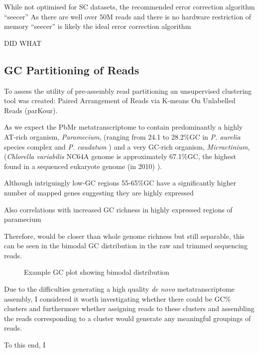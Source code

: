 While not optimised for SC datasets, the recommended error correction
algorithm ``seecer'' 
As there are well over 50M reads and there is no hardware restriction of memory
``seecer'' is likely the ideal error correction algorithm \citep{Macmanes2015}

DID WHAT 



\subsection{GC Partitioning of Reads}

To assess the utility of pre-assembly read partitioning an unsupervised clustering tool was created:
Paired Arrangement of Reads via K-means On Unlabelled Reads (parKour).

As we expect the PbMr metatranscriptome to contain predominantly a highly AT-rich organism, \textit{Paramecium},
(ranging from 24.1 to 28.2\%GC in \textit{P. aurelia} species complex and \textit{P. caudatum} \citep{Aury2006,McGrath2014})
and a very GC-rich organism, \textit{Micractinium}, (\textit{Chlorella variabilis} NC64A genome is approximately 67.1\%GC, the highest
found in a sequenced eukaryote genome (in 2010) \citep{Blanc2010}).  



Although intriguingly low-GC regions 55-65\%GC have a significantly higher number of mapped genes suggesting they are highly expressed \citep{Blanc2010}

Also correlations with increased GC richness in highly expressed regions of paramecium

Therefore,  would be closer than whole genome richness but still separable, this can be seen in the bimodal GC distribution in the raw and trimmed sequencing 
reads.

\begin{figure}
    Example GC plot showing bimodal distribution
\end{figure}

Due to the difficulties generating a high quality \textit{de novo} metatranscriptome assembly, I considered  it worth investigating whether there could be GC\%
clusters and furthermore whether assigning reads to these clusters and assembling the reads corresponding to a cluster would generate any meaningful groupings of reads.

To this end, I 

